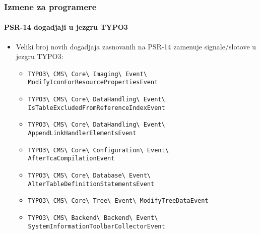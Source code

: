 \begin{frame}[fragile]
	\frametitle{Izmene za programere}
	\framesubtitle{PSR-14 dogadjaji u jezgru TYPO3}

	\begin{itemize}
		\item Veliki broj novih dogadjaja zasnovanih na PSR-14 zamenuje signale/slotove u jezgru TYPO3:
			\newline

			\begin{itemize}\tiny
				\item \texttt{TYPO3\textbackslash
					CMS\textbackslash
					Core\textbackslash
					Imaging\textbackslash
					Event\textbackslash
					ModifyIconForResourcePropertiesEvent}
					\newline
				\item \texttt{TYPO3\textbackslash
					CMS\textbackslash
					Core\textbackslash
					DataHandling\textbackslash
					Event\textbackslash
					IsTableExcludedFromReferenceIndexEvent}
					\newline
				\item \texttt{TYPO3\textbackslash
					CMS\textbackslash
					Core\textbackslash
					DataHandling\textbackslash
					Event\textbackslash
					AppendLinkHandlerElementsEvent}
					\newline
				\item \texttt{TYPO3\textbackslash
					CMS\textbackslash
					Core\textbackslash
					Configuration\textbackslash
					Event\textbackslash
					AfterTcaCompilationEvent}
					\newline
				\item \texttt{TYPO3\textbackslash
					CMS\textbackslash
					Core\textbackslash
					Database\textbackslash
					Event\textbackslash
					AlterTableDefinitionStatementsEvent}
					\newline
				\item \texttt{TYPO3\textbackslash
					CMS\textbackslash
					Core\textbackslash
					Tree\textbackslash
					Event\textbackslash
					ModifyTreeDataEvent}
					\newline
				\item \texttt{TYPO3\textbackslash
					CMS\textbackslash
					Backend\textbackslash
					Backend\textbackslash
					Event\textbackslash
					SystemInformationToolbarCollectorEvent}
					\newline
			\end{itemize}

	\end{itemize}

\end{frame}

